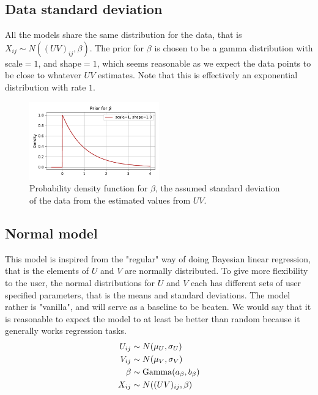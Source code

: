 \documentclass[12pt]{article}
\begin{document}
    \subsection*{Data standard deviation}
        All the models share the same distribution for the data, that is $X_{ij}\sim N((UV)_{ij}, \beta)$. The prior for $\beta$ is chosen to be a gamma distribution with scale$=1$, and shape$=1$, which seems reasonable as we expect the data points to be close to whatever $UV$ estimates. Note that this is effectively an exponential distribution with rate $1$.
    
        \begin{figure}[H]
            \centering
            \includegraphics[width=0.5\textwidth]{betaprior.pdf}
            \caption{Probability density function for $\beta$, the assumed standard deviation of the data from the estimated values from $UV$.}
        \end{figure}
    
    \subsection{Normal model}
    This model is inspired from the "regular" way of doing Bayesian linear regression, that is the elements of $U$ and $V$ are normally distributed. To give more flexibility to the user, the normal distributions for $U$ and $V$ each has different sets of user specified parameters, that is the means and standard deviations. The model rather is "vanilla", and will serve as a baseline to be beaten. We would say that it is reasonable to expect the model to at least be better than random because it generally works regression tasks.
    \begin{align*}
        U_{ij}  &\sim N(\mu_U, \sigma_U) \\
        V_{ij}  &\sim N(\mu_V, \sigma_V) \\
        \beta  &\sim \operatorname{Gamma}(a_\beta, b_\beta) \\
        X_{ij} &\sim N((UV)_{ij}, \beta) 
    \end{align*}
\end{document}
